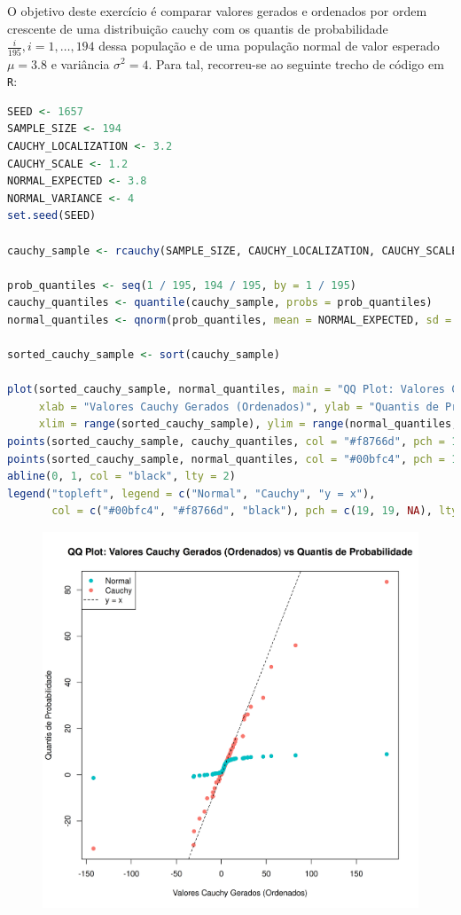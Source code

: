 \documentclass[12pt,a4paper]{article}
\begin{document}
O objetivo deste exercício é comparar valores gerados e ordenados por ordem crescente de uma distribuição cauchy com os
quantis de probabilidade $\frac{i}{195}, i = 1,…,194$ dessa população e de uma população normal de valor esperado
$\mu = 3.8$ e variância $\sigma^{2} = 4$.
Para tal, recorreu-se ao seguinte trecho de código em \texttt{R}:

\quad

\begin{lstlisting}[language=R]
SEED <- 1657
SAMPLE_SIZE <- 194
CAUCHY_LOCALIZATION <- 3.2
CAUCHY_SCALE <- 1.2
NORMAL_EXPECTED <- 3.8
NORMAL_VARIANCE <- 4
set.seed(SEED)

cauchy_sample <- rcauchy(SAMPLE_SIZE, CAUCHY_LOCALIZATION, CAUCHY_SCALE)

prob_quantiles <- seq(1 / 195, 194 / 195, by = 1 / 195)
cauchy_quantiles <- quantile(cauchy_sample, probs = prob_quantiles)
normal_quantiles <- qnorm(prob_quantiles, mean = NORMAL_EXPECTED, sd = sqrt(NORMAL_VARIANCE))

sorted_cauchy_sample <- sort(cauchy_sample)

plot(sorted_cauchy_sample, normal_quantiles, main = "QQ Plot: Valores Cauchy Gerados (Ordenados) vs Quantis de Probabilidade",
     xlab = "Valores Cauchy Gerados (Ordenados)", ylab = "Quantis de Probabilidade",
     xlim = range(sorted_cauchy_sample), ylim = range(normal_quantiles, cauchy_quantiles))
points(sorted_cauchy_sample, cauchy_quantiles, col = "#f8766d", pch = 19)
points(sorted_cauchy_sample, normal_quantiles, col = "#00bfc4", pch = 19)
abline(0, 1, col = "black", lty = 2)
legend("topleft", legend = c("Normal", "Cauchy", "y = x"),
       col = c("#00bfc4", "#f8766d", "black"), pch = c(19, 19, NA), lty = c(NA, NA, 2))
\end{lstlisting}

\quad

\begin{figure}[h]
  \centering
  \includegraphics[scale = 0.77]{./ex08.png}
\end{figure}
\end{document}
